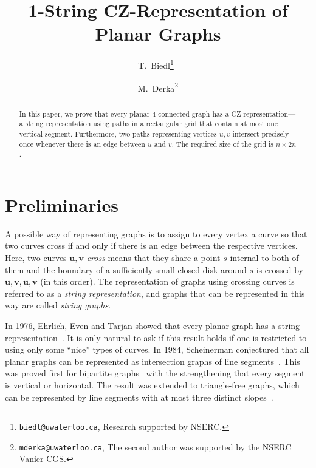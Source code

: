 \documentclass{article}
\newcommand{\bb}[1]{\ensuremath{\mathbf{#1}}}
\begin{document}
\title{1-String CZ-Representation of Planar Graphs}

\author{T.~Biedl\thanks{\texttt{biedl@uwaterloo.ca}, Research supported by NSERC.}~}
\author{M.~Derka\thanks{\texttt{mderka@uwaterloo.ca}, The second author was supported by the NSERC Vanier CGS.}}



\renewcommand\Authands{~and~}





\maketitle

\begin{abstract}
In this paper, we prove that every planar 4-connected graph has a CZ-representation---a
string representation using paths in a rectangular grid that contain at most one vertical segment. 
Furthermore, two paths representing vertices $u,v$ intersect precisely once whenever there
is an edge between $u$ and $v$. The required size of the grid is $n \times 2n$.
\end{abstract}




\section{Preliminaries}

A possible way of representing graphs is to assign to every vertex a curve so
that two curves cross if and only if there is an edge between the respective vertices. 
Here, two curves $\bb{u},\bb{v}$ \emph{cross} means that
they share a point $s$ internal to both of them and 
the boundary of a sufficiently small closed disk around $s$ 
is crossed by $\bb{u},\bb{v},\bb{u},\bb{v}$ (in this order).
The representation of graphs using crossing curves is referred to as a \emph{string representation},
and graphs that can be represented in this way are called \emph{string graphs}.

In 1976, Ehrlich, Even and Tarjan showed that every planar graph has a string representation~\cite{cit:tarjan}.
It is only natural to ask if this result holds if one is restricted to using
only some ``nice'' types of curves. In 1984, Scheinerman conjectured that all planar graphs can
be represented as intersection graphs of line segments~\cite{cit:scheinerman}.
This was proved first for bipartite graphs~\cite{cit:arroyo, cit:pach} with the strengthening
that every segment is vertical or horizontal. The result was extended to triangle-free
graphs, which can be represented by line segments with at most three distinct slopes~\cite{cit:castro}.
\end{document}

